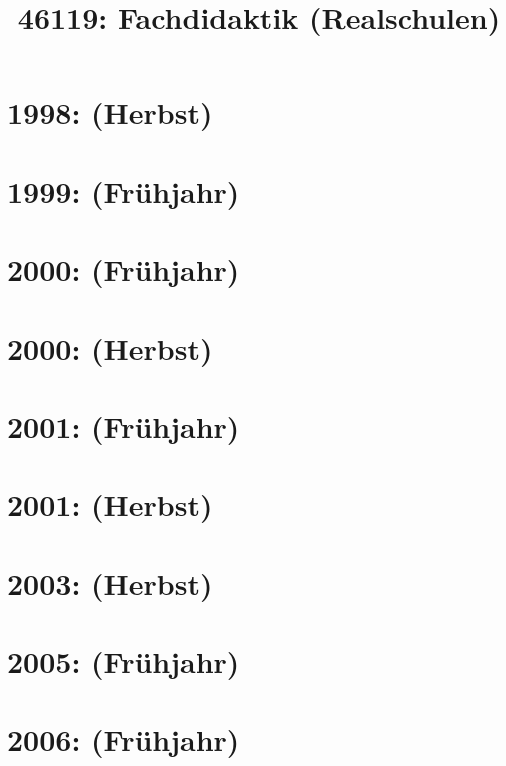 \documentclass{lehramt-informatik-haupt}
\title{46119: Fachdidaktik (Realschulen)}
\begin{document}
\maketitle
\tableofcontents

\section{1998: (Herbst)}


\section{1999: (Frühjahr)}


\section{2000: (Frühjahr)}


\section{2000: (Herbst)}


\section{2001: (Frühjahr)}


\section{2001: (Herbst)}


\section{2003: (Herbst)}


\section{2005: (Frühjahr)}


\section{2006: (Frühjahr)}

\end{document}
